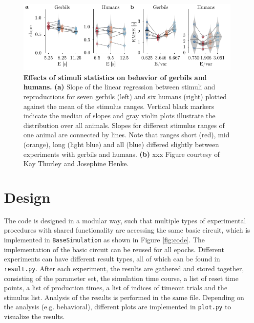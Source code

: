 \documentclass[10pt]{article}
\begin{document}
\begin{figure}[!htb]
	\centering
	\includegraphics{figures/supp_underestimationE.pdf}
	\caption{\textbf{Effects of stimuli statistics on behavior of gerbils and humans.}
	\textbf{(a)} Slope of the linear regression between stimuli and reproductions for seven gerbils (left) and six humans (right) plotted against the mean of the stimulus ranges. Vertical black markers indicate the median of slopes and gray violin plots illustrate the distribution over all animals. Slopes for different stimulus ranges of one animal are connected by lines. Note that ranges short (red), mid (orange), long (light blue) and all (blue) differed slightly between experiments with gerbils and humans.
	\textbf{(b)} xxx
	Figure courtesy of Kay Thurley and Josephine Henke.
	}
\label{sup:underestimation}
\end{figure}

\pagebreak

\section{Design}
The code is designed in a modular way, such that multiple types of experimental procedures with shared functionality are accessing the same basic circuit, which is implemented in \texttt{BaseSimulation} as shown in Figure \ref{fig:code}.
The implementation of the basic circuit can be reused for all epochs.
Different experiments can have different result types, all of which can be found in \texttt{result.py}. After each experiment, the results are gathered and stored together, consisting of the parameter set, the simulation time course, a list of reset time points, a list of production times, a list of indices of timeout trials and the stimulus list.
Analysis of the results is performed in the same file. Depending on the analysis (e.g. behavioral), different plots are implemented in \texttt{plot.py} to visualize the results. 
\end{document}
